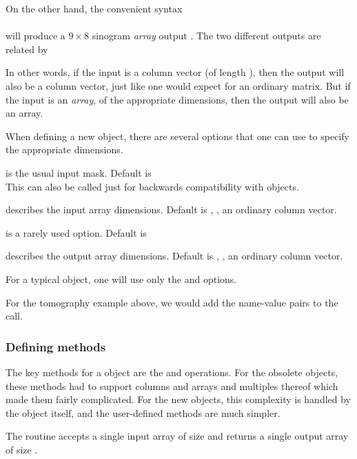 On the other hand,
the convenient syntax
\\
\\
will produce a $9 \times 8$ sinogram \emph{array} output .
The two different outputs
are related by
\\

In other words,
if the input is a column vector (of length \np),
then the output will also be a column vector,
just like one would expect for an ordinary matrix.
But if the input is an \emph{array},
of the appropriate dimensions,
then the output will also be an array.

When defining a new \fatrixx object,
there are several options
that one can use to specify
the appropriate dimensions.

\blist
\item
{}
is the usual input mask.
Default is 
\\
This can also be called just 
for backwards compatibility with \fatrix objects.

\item
{}
describes the input array dimensions.
Default is ,
\ie, an ordinary column vector.

\item
{}
is a rarely used option.
Default is 

\item
{}
describes the output array dimensions.
Default is ,
\ie, an ordinary column vector.
\elist

For a typical \fatrixx object,
one will use only the  and  options.

For the tomography example above,
we would add the name-value pairs
to the  call.


\subsubsection{Defining \fatrixx methods}

The key methods for a \fatrixx object
are the  and  operations.
For the obsolete \fatrix objects,
these methods had to support columns and arrays
and multiples thereof
which made them fairly complicated.
For the new \fatrixx objects,
this complexity is handled by the object itself,
and the user-defined methods are much simpler.

The  routine
accepts a single input array
of size 
and returns a single output array
of size .

